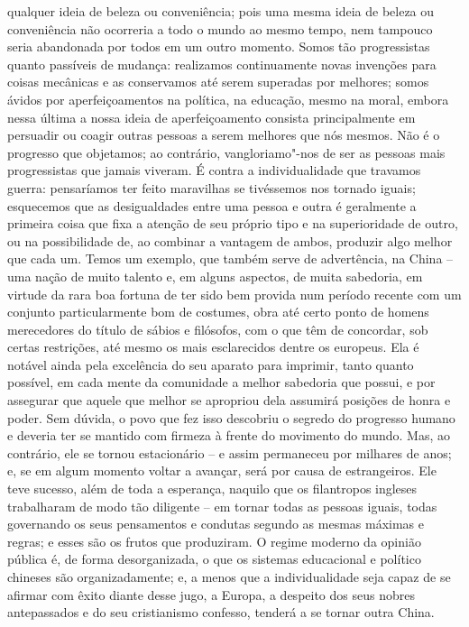 qualquer ideia de beleza ou conveniência; pois uma mesma ideia de
beleza ou conveniência não ocorreria a todo o mundo ao mesmo tempo, nem
tampouco seria abandonada por todos em um outro momento. Somos tão
progressistas quanto passíveis de mudança: realizamos continuamente
novas invenções para coisas mecânicas e as conservamos até serem
superadas por melhores; somos ávidos por aperfeiçoamentos na política,
na educação, mesmo na moral, embora nessa última a nossa ideia de
aperfeiçoamento consista principalmente em persuadir ou coagir outras
pessoas a serem melhores que nós mesmos. Não é o progresso que
objetamos; ao contrário, vangloriamo"-nos de ser as pessoas mais
progressistas que jamais viveram. É contra a individualidade que
travamos guerra: pensaríamos ter feito maravilhas se tivéssemos nos
tornado iguais; esquecemos que as desigualdades entre uma pessoa e outra
é geralmente a primeira coisa que fixa a atenção de seu próprio tipo e
na superioridade de outro, ou na possibilidade de, ao combinar a
vantagem de ambos, produzir algo melhor que cada um. Temos um exemplo,
que também serve de advertência, na China – uma nação de muito talento
e, em alguns aspectos, de muita sabedoria, em virtude da rara boa
fortuna de ter sido bem provida num período recente com um conjunto
particularmente bom de costumes, obra até certo ponto de homens
merecedores do título de sábios e filósofos, com o que têm de
concordar, sob certas restrições, até mesmo os mais esclarecidos dentre
os europeus. Ela é notável ainda pela excelência do seu aparato para
imprimir, tanto quanto possível, em cada mente da comunidade a melhor
sabedoria que possui, e por assegurar que aquele que melhor se
apropriou dela assumirá posições de honra e poder. Sem dúvida, o povo
que fez isso descobriu o segredo do progresso humano e deveria ter se
mantido com firmeza à frente do movimento do mundo. Mas, ao contrário,
ele se tornou estacionário – e assim permaneceu por milhares de anos;
e, se em algum momento voltar a avançar, será por causa de
estrangeiros. Ele teve sucesso, além de toda a esperança, naquilo que
os filantropos ingleses trabalharam de modo tão diligente – em tornar
todas as pessoas iguais, todas governando os seus pensamentos e
condutas segundo as mesmas máximas e regras; e esses são os frutos que
produziram. O regime moderno da opinião pública é, de forma
desorganizada, o que os sistemas educacional e político chineses são
organizadamente; e, a menos que a individualidade seja capaz de se
afirmar com êxito diante desse jugo, a Europa, a despeito dos seus
nobres antepassados e do seu cristianismo confesso, tenderá a se tornar
outra China.

